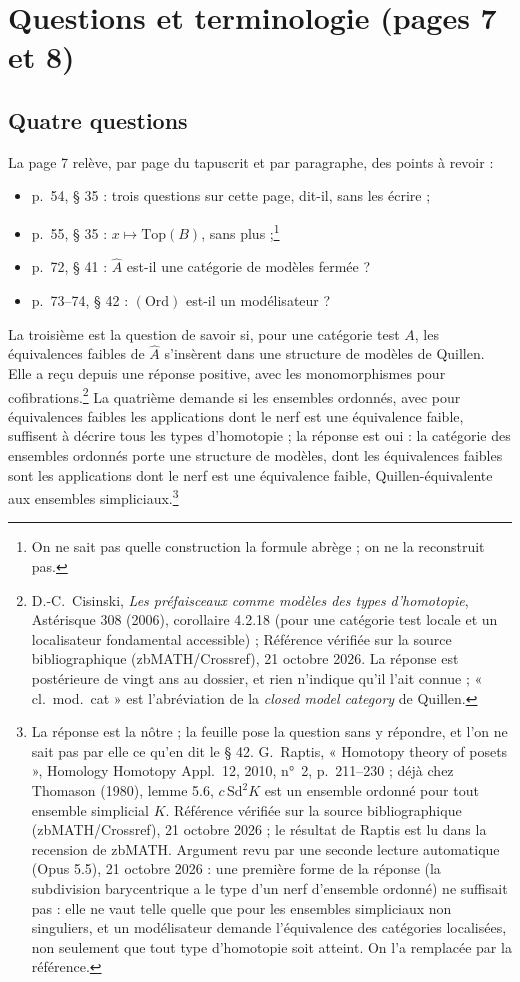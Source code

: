 \documentclass[11pt,a4paper]{article}
\begin{document}
\section*{Questions et terminologie (pages 7 et 8)}

\subsection*{Quatre questions}

La page 7 relève, par page du tapuscrit et par paragraphe, des points à
revoir :
\begin{itemize}
\item p.\ 54, § 35 : trois questions sur cette page, dit-il, sans les
écrire ;
\item p.\ 55, § 35 : $x \mapsto \mathrm{Top}(B)$, sans plus ;\footnote{On ne
sait pas quelle construction la formule abrège ; on ne la reconstruit pas.}
\item p.\ 72, § 41 : $\widehat{A}$ est-il une catégorie de modèles fermée ?
\item p.\ 73--74, § 42 : $(\mathrm{Ord})$ est-il un modélisateur ?
\end{itemize}

La troisième est la question de savoir si, pour une catégorie test $A$, les
équivalences faibles de $\widehat{A}$ s'insèrent dans une structure de
modèles de Quillen. Elle a reçu depuis une réponse positive, avec les
monomorphismes pour cofibrations.\footnote{D.-C.~Cisinski, \emph{Les
préfaisceaux comme modèles des types d'homotopie}, Astérisque 308 (2006), corollaire 4.2.18 (pour une catégorie test locale et un localisateur fondamental accessible) ; Référence vérifiée sur la source bibliographique (zbMATH/Crossref), 21 octobre 2026. La réponse est postérieure de vingt ans au dossier, et rien
n'indique qu'il l'ait connue ; « cl.\ mod.\ cat » est l'abréviation de la
\emph{closed model category} de Quillen.} La quatrième demande si les ensembles
ordonnés, avec pour équivalences faibles les applications dont le nerf est une
équivalence faible, suffisent à décrire tous les types d'homotopie ; la réponse est oui : la catégorie des ensembles ordonnés porte une structure de modèles, dont les équivalences faibles sont les applications dont le nerf est une équivalence faible, Quillen-équivalente aux ensembles simpliciaux.\footnote{La réponse est la nôtre ; la feuille pose la question sans y répondre, et l'on ne sait pas par elle ce qu'en dit le § 42. G.~Raptis, « Homotopy theory of posets », Homology Homotopy Appl.\ 12, 2010, n°~2, p.~211--230 ; déjà chez Thomason (1980), lemme 5.6, $c\,\mathrm{Sd}^{2}K$ est un ensemble ordonné pour tout ensemble simplicial $K$. Référence vérifiée sur la source bibliographique (zbMATH/Crossref), 21 octobre 2026 ; le résultat de Raptis est lu dans la recension de zbMATH. Argument revu par une seconde lecture automatique (Opus 5.5), 21 octobre 2026 : une première forme de la réponse (la subdivision barycentrique a le type d'un nerf d'ensemble ordonné) ne suffisait pas : elle ne vaut telle quelle que pour les ensembles simpliciaux non singuliers, et un modélisateur demande l'équivalence des catégories localisées, non seulement que tout type d'homotopie soit atteint. On l'a remplacée par la référence.}
\end{document}
